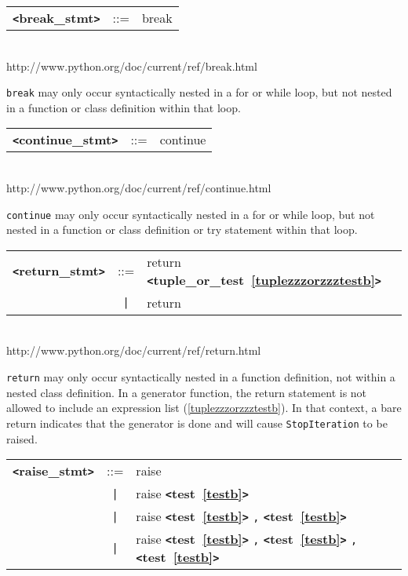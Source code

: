 \documentclass[12pt]{article}
\begin{document}
\label{breakzzzstmtb}
\begin{tabular}{lcl}
{\bf \verb+<+break\_stmt\verb+>+} & ::=  & break \\
\end{tabular} \\

http://www.python.org/doc/current/ref/break.html

\verb+break+ may only occur syntactically nested in a for or while loop, 
but not nested in a function or class definition within that loop.   

\label{continuezzzstmtb}
\begin{tabular}{lcl}
{\bf \verb+<+continue\_stmt\verb+>+} & ::=  & continue \\
\end{tabular} \\

http://www.python.org/doc/current/ref/continue.html

\verb|continue| may only occur syntactically nested in a for or while loop, 
but not nested in a function or class definition or try statement within 
that loop.

\label{returnzzzstmtb}
\begin{tabular}{lcl}
{\bf \verb+<+return\_stmt\verb+>+} & ::=  & return {\bf \verb+<+tuple\_or\_test~\ref{tuplezzzorzzztestb}\verb+>+}  \\
 & \verb+|+  & return \\
\end{tabular} \\

http://www.python.org/doc/current/ref/return.html

\verb|return| may only occur syntactically nested in a function definition, 
not within a nested class definition.  In a generator function, 
the return statement is not allowed to include an expression list (\ref{tuplezzzorzzztestb}). In that context, a bare return indicates that the generator is done and will cause \verb|StopIteration| to be raised. 

\label{raisezzzstmtb}
\begin{tabular}{lcl}
{\bf \verb+<+raise\_stmt\verb+>+} & ::=  & raise \\
 & \verb+|+  & raise {\bf \verb+<+test~\ref{testb}\verb+>+}  \\
 & \verb+|+  & raise {\bf \verb+<+test~\ref{testb}\verb+>+}  \verb|,| {\bf \verb+<+test~\ref{testb}\verb+>+}  \\
 & \verb+|+  & raise {\bf \verb+<+test~\ref{testb}\verb+>+}  \verb|,| {\bf \verb+<+test~\ref{testb}\verb+>+}  \verb|,| {\bf \verb+<+test~\ref{testb}\verb+>+}  \\
\end{tabular} \\
\end{document}
